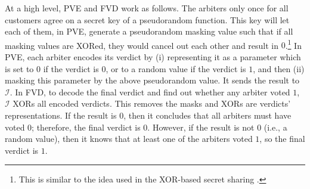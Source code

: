 




At a high level, PVE and  FVD work as follows.  The arbiters only once for all customers agree on a secret key of a pseudorandom function. This key will let each of them, in PVE,  generate a pseudorandom masking value such that if all masking values are XORed, they would cancel out each other and result in $0$.\footnote{This is similar to the idea used in the XOR-based secret sharing \cite{Schneier0078909}.} In PVE, each arbiter encodes its verdict by (i) representing it as a parameter which is set to  $0$ if the verdict is $0$, or to a random value if the verdict is $1$, and then (ii) masking this parameter by the above  pseudorandom value.  It sends the result to $\mathcal{I}$.  In FVD, to decode the final verdict and find out whether any arbiter voted $1$, $\mathcal{I}$   XORs all encoded verdicts. This removes the masks and XORs are verdicts' representations.  If the result is $0$, then  it concludes that  all arbiters must have voted $0$; therefore,  the final verdict is $0$. However, if the result is not $0$ (i.e., a random value), then it knows that at least one of the arbiters voted $1$, so  the final verdict is $1$. %

